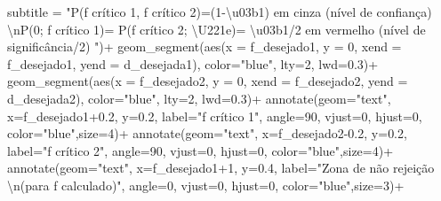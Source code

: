 \documentclass[
]{book}
\newenvironment{Shaded}{\begin{snugshade}}{\end{snugshade}}
\newcommand{\AttributeTok}[1]{\textcolor[rgb]{0.77,0.63,0.00}{#1}}
\newcommand{\DecValTok}[1]{\textcolor[rgb]{0.00,0.00,0.81}{#1}}
\newcommand{\FloatTok}[1]{\textcolor[rgb]{0.00,0.00,0.81}{#1}}
\newcommand{\FunctionTok}[1]{\textcolor[rgb]{0.00,0.00,0.00}{#1}}
\newcommand{\NormalTok}[1]{#1}
\newcommand{\SpecialCharTok}[1]{\textcolor[rgb]{0.00,0.00,0.00}{#1}}
\newcommand{\StringTok}[1]{\textcolor[rgb]{0.31,0.60,0.02}{#1}}
\begin{document}
\begin{Shaded}
\begin{Highlighting}[]
  \AttributeTok{subtitle =} \StringTok{"P(f crítico 1, f crítico 2)=(1{-}\textbackslash{}u03b1) em cinza (nível de confiança) }\SpecialCharTok{\textbackslash{}n}\StringTok{P(0; f crítico 1)= P(f crítico 2; \textbackslash{}U221e)= \textbackslash{}u03b1/2 em vermelho (nível de significância/2) "}\NormalTok{)}\SpecialCharTok{+}
  \FunctionTok{geom\_segment}\NormalTok{(}\FunctionTok{aes}\NormalTok{(}\AttributeTok{x =}\NormalTok{ f\_desejado1, }\AttributeTok{y =} \DecValTok{0}\NormalTok{, }\AttributeTok{xend =}\NormalTok{ f\_desejado1, }\AttributeTok{yend =}\NormalTok{ d\_desejada1), }\AttributeTok{color=}\StringTok{"blue"}\NormalTok{, }\AttributeTok{lty=}\DecValTok{2}\NormalTok{, }\AttributeTok{lwd=}\FloatTok{0.3}\NormalTok{)}\SpecialCharTok{+}
  \FunctionTok{geom\_segment}\NormalTok{(}\FunctionTok{aes}\NormalTok{(}\AttributeTok{x =}\NormalTok{ f\_desejado2, }\AttributeTok{y =} \DecValTok{0}\NormalTok{, }\AttributeTok{xend =}\NormalTok{ f\_desejado2, }\AttributeTok{yend =}\NormalTok{ d\_desejada2), }\AttributeTok{color=}\StringTok{"blue"}\NormalTok{, }\AttributeTok{lty=}\DecValTok{2}\NormalTok{, }\AttributeTok{lwd=}\FloatTok{0.3}\NormalTok{)}\SpecialCharTok{+}
  \FunctionTok{annotate}\NormalTok{(}\AttributeTok{geom=}\StringTok{"text"}\NormalTok{, }\AttributeTok{x=}\NormalTok{f\_desejado1}\FloatTok{+0.2}\NormalTok{, }\AttributeTok{y=}\FloatTok{0.2}\NormalTok{, }\AttributeTok{label=}\StringTok{"f crítico 1"}\NormalTok{, }\AttributeTok{angle=}\DecValTok{90}\NormalTok{, }\AttributeTok{vjust=}\DecValTok{0}\NormalTok{, }\AttributeTok{hjust=}\DecValTok{0}\NormalTok{, }\AttributeTok{color=}\StringTok{"blue"}\NormalTok{,}\AttributeTok{size=}\DecValTok{4}\NormalTok{)}\SpecialCharTok{+}
  \FunctionTok{annotate}\NormalTok{(}\AttributeTok{geom=}\StringTok{"text"}\NormalTok{, }\AttributeTok{x=}\NormalTok{f\_desejado2}\FloatTok{{-}0.2}\NormalTok{, }\AttributeTok{y=}\FloatTok{0.2}\NormalTok{, }\AttributeTok{label=}\StringTok{"f crítico 2"}\NormalTok{, }\AttributeTok{angle=}\DecValTok{90}\NormalTok{, }\AttributeTok{vjust=}\DecValTok{0}\NormalTok{, }\AttributeTok{hjust=}\DecValTok{0}\NormalTok{, }\AttributeTok{color=}\StringTok{"blue"}\NormalTok{,}\AttributeTok{size=}\DecValTok{4}\NormalTok{)}\SpecialCharTok{+}
  \FunctionTok{annotate}\NormalTok{(}\AttributeTok{geom=}\StringTok{"text"}\NormalTok{, }\AttributeTok{x=}\NormalTok{f\_desejado1}\SpecialCharTok{+}\DecValTok{1}\NormalTok{, }\AttributeTok{y=}\FloatTok{0.4}\NormalTok{, }\AttributeTok{label=}\StringTok{"Zona de não rejeição }\SpecialCharTok{\textbackslash{}n}\StringTok{(para f calculado)"}\NormalTok{, }\AttributeTok{angle=}\DecValTok{0}\NormalTok{, }\AttributeTok{vjust=}\DecValTok{0}\NormalTok{, }\AttributeTok{hjust=}\DecValTok{0}\NormalTok{, }\AttributeTok{color=}\StringTok{"blue"}\NormalTok{,}\AttributeTok{size=}\DecValTok{3}\NormalTok{)}\SpecialCharTok{+}

\end{Highlighting}
\end{Shaded}
\end{document}

